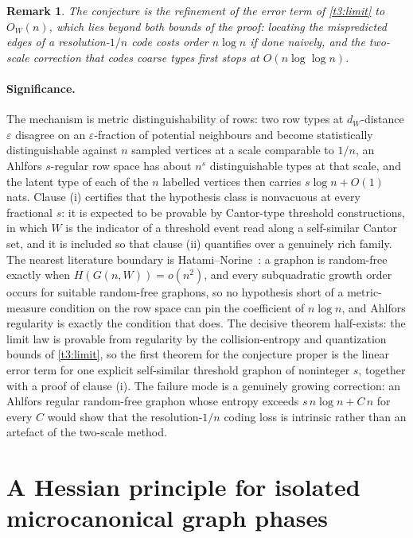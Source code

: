 \documentclass[11pt]{article}
\newtheorem{remark}{Remark}
\theoremstyle{definition}
\begin{document}
\begin{remark}\label{t3:refined}
The conjecture is the refinement of the error term of \cref{t3:limit}
to $O_W(n)$, which lies beyond both bounds of the proof: locating the
mispredicted edges of a resolution-$1/n$ code costs order $n\log n$ if
done naively, and the two-scale correction that codes coarse types
first stops at $O(n\log\log n)$.
\end{remark}

\paragraph{Significance.}
The mechanism is metric distinguishability of rows: two row types at
$d_W$-distance $\varepsilon$ disagree on an $\varepsilon$-fraction of
potential neighbours and become statistically distinguishable against
$n$ sampled vertices at a scale comparable to $1/n$, an Ahlfors
$s$-regular row space has about $n^s$ distinguishable types at that
scale, and the latent type of each of the $n$ labelled vertices then
carries $s\log n+O(1)$ nats.  Clause (i) certifies that the
hypothesis class is nonvacuous at every fractional $s$: it is expected
to be provable by Cantor-type threshold constructions, in which $W$ is
the indicator of a threshold event read along a self-similar Cantor
set, and it is included so that clause (ii) quantifies over a
genuinely rich family.  The nearest literature boundary is
Hatami--Norine~\cite{HN13}: a graphon is random-free exactly when
$H(G(n,W))=o(n^2)$, and every subquadratic growth order occurs for
suitable random-free graphons, so no hypothesis short of a
metric-measure condition on the row space can pin the coefficient of
$n\log n$, and Ahlfors regularity is exactly the condition that does.
The decisive theorem half-exists: the limit law is provable from regularity by the collision-entropy and quantization bounds of \cref{t3:limit}, so the first theorem for the conjecture proper is the linear error term for one explicit self-similar threshold graphon of noninteger $s$, together with a proof of clause (i).  The failure mode is a genuinely growing correction: an Ahlfors regular random-free graphon whose entropy exceeds $s\,n\log n+C\,n$ for every $C$ would show that the resolution-$1/n$ coding loss is intrinsic rather than an artefact of the two-scale method.

\section{A Hessian principle for isolated microcanonical graph phases}
\end{document}

